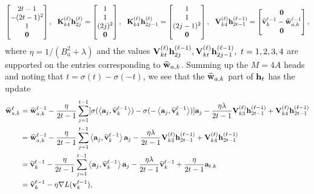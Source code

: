 \begin{align*}
\begin{bmatrix}
         2t-1\\-(2t-1)^2\\ 1\\{\mathbf 0}
    \end{bmatrix},~~ {\mathbf K}_{k4}^{(\ell)}{\mathbf h}^{(\ell)}_{2j}=\begin{bmatrix}
        1\\ 1 \\(2j)^2\\{\mathbf 0}
    \end{bmatrix},~~ 
{\mathbf K}_{k4}^{(\ell)}{\mathbf h}^{(\ell)}_{2j-1}=\begin{bmatrix}
        1\\ 1 \\(2j-1)^2\\{\mathbf 0}
    \end{bmatrix},~~ {\mathbf V}_{k4}^{(\ell)}{\mathbf h}^{(\ell-1)}_{2t-1}=\begin{bmatrix}
        {\mathbf 0}\\ \widehat{{\mathbf v}}^{\ell-1}_{k}-\widehat{{\mathbf w}}_{a,k}^{\ell-1}\\ {\mathbf 0}
    \end{bmatrix},
\end{align*}
where $\eta=1/(B_a^2+\lambda)$ and the values ${\mathbf V}_{kt}^{(\ell)}{\mathbf h}^{(\ell-1)}_{2j},{\mathbf V}_{kt}^{(\ell)}{\mathbf h}^{(\ell-1)}_{2j-1},~t=1,2,3,4$ are supported on the entries corresponding to $\widehat{{\mathbf w}}_{a,k}$.
Summing up the $M=4A$ heads and noting that $t=\sigma(t)-\sigma(-t)$, we see that the $\widehat{{\mathbf w}}_{a,k}$ part of ${\mathbf h}_t$ has the update
\begin{align*}
    \widehat{{\mathbf w}}_{a,k}^{\ell}
    &=
    \widehat{{\mathbf w}}_{a,k}^{\ell-1}-\frac{\eta}{2t-1}\sum_{j=1}^{t-1}[\sigma(\left\langle{\mathbf a}_j,\widehat{{\mathbf v}}_k^{\ell-1}\right\rangle)-\sigma(-\left\langle{\mathbf a}_j,\widehat{{\mathbf v}}_k^{\ell-1}\right\rangle)]{\mathbf a}_j-\frac{\eta\lambda}{2t-1}{\mathbf V}_{k3}^{(\ell)}{\mathbf h}^{(\ell-1)}_{2t-1}+{\mathbf V}_{k4}^{(\ell)}{\mathbf h}^{(\ell-1)}_{2t-1}\\
     &=
     \widehat{{\mathbf w}}_{a,k}^{\ell-1}-\frac{\eta}{2t-1}\sum_{j=1}^{t-1}\left\langle{\mathbf a}_j,\widehat{{\mathbf v}}_k^{\ell-1}\right\rangle{\mathbf a}_j-\frac{\eta\lambda}{2t-1}{\mathbf V}_{k3}^{(\ell)}{\mathbf h}^{(\ell-1)}_{2t-1}+{\mathbf V}_{k4}^{(\ell)}{\mathbf h}^{(\ell-1)}_{2t-1}\\
     &=
     \widehat{{\mathbf v}}_k^{\ell-1}-\frac{\eta}{2t-1}\sum_{j=1}^{t-1}\left\langle{\mathbf a}_j,\widehat{{\mathbf v}}_k^{\ell-1}\right\rangle{\mathbf a}_j-\frac{\eta\lambda}{2t-1}\widehat{{\mathbf v}}_k^{\ell-1}+\frac{\eta}{2t-1}{\mathbf a}_{t,k}\\
     &=\widehat{{\mathbf v}}_k^{\ell-1}-\eta\nabla L({\mathbf v}_k^{\ell-1}),
\end{align*}
